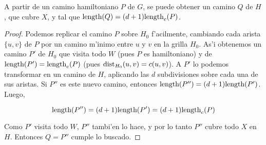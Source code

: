 \begin{lemma}
\label{le:rectilinear_ptsp_to_grid_sr}
A partir de un camino hamiltoniano $P$ de $G$, se puede obtener un camino $Q$ de $H$, que cubre $X$, y tal que $\textnormal{length}(Q) = (d + 1)\textnormal{length}_c(P)$.

\begin{proof}
Podemos replicar el camino $P$ sobre $H_0$ f'acilmente, cambiando cada arista $\{u, v\}$ de $P$ por un camino m'inimo entre $u$ y $v$ en la grilla $H_0$. As'i obtenemos un camino $P'$ de $H_0$ que visita todo $W$ (pues $P$ es hamiltoniano) y de $\textnormal{length}(P') = \textnormal{length}_c(P)$ (pues $\textnormal{dist}_{H_0}(u, v) = c(u, v)$). A $P'$ lo podemos transformar en un camino de $H$, aplicando las $d$ subdivisiones sobre cada una de sus aristas. Si $P''$ es este nuevo camino, entonces $\textnormal{length}(P'') = (d + 1) \textnormal{length}(P')$. Luego,

\[\textnormal{length}(P'') = (d + 1) \textnormal{length}(P') = (d + 1) \textnormal{length}_c(P)\]

\noindent
Como $P'$ visita todo $W$, $P''$ tambi'en lo hace, y por lo tanto $P''$ cubre todo $X$ en $H$. Entonces $Q = P''$ cumple lo buscado.
\end{proof}
\end{lemma}


